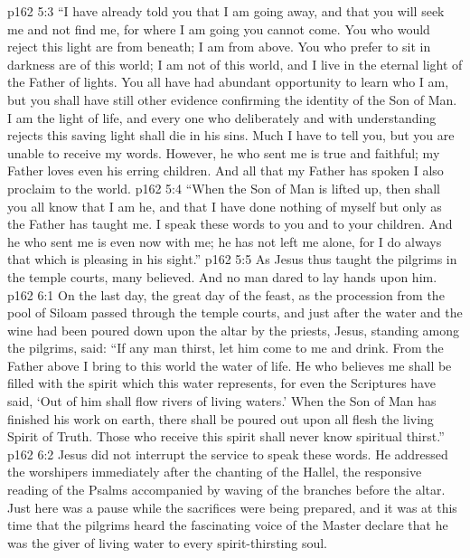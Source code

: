 \vs p162 5:3 \textcolor{ubdarkred}{“I have already told you that I am going away, and that you will seek me and not find me, for where I am going you cannot come. You who would reject this light are from beneath; I am from above. You who prefer to sit in darkness are of this world; I am not of this world, and I live in the eternal light of the Father of lights. You all have had abundant opportunity to learn who I am, but you shall have still other evidence confirming the identity of the Son of Man. I am the light of life, and every one who deliberately and with understanding rejects this saving light shall die in his sins. Much I have to tell you, but you are unable to receive my words. However, he who sent me is true and faithful; my Father loves even his erring children. And all that my Father has spoken I also proclaim to the world.}
\vs p162 5:4 \textcolor{ubdarkred}{“When the Son of Man is lifted up, then shall you all know that I am he, and that I have done nothing of myself but only as the Father has taught me. I speak these words to you and to your children. And he who sent me is even now with me; he has not left me alone, for I do always that which is pleasing in his sight.”}
\vs p162 5:5 \pc As Jesus thus taught the pilgrims in the temple courts, many believed. And no man dared to lay hands upon him.
\vs p162 6:1 On the last day, the great day of the feast, as the procession from the pool of Siloam passed through the temple courts, and just after the water and the wine had been poured down upon the altar by the priests, Jesus, standing among the pilgrims, said: \textcolor{ubdarkred}{“If any man thirst, let him come to me and drink. From the Father above I bring to this world the water of life. He who believes me shall be filled with the spirit which this water represents, for even the Scriptures have said, ‘Out of him shall flow rivers of living waters.’ When the Son of Man has finished his work on earth, there shall be poured out upon all flesh the living Spirit of Truth. Those who receive this spirit shall never know spiritual thirst.”}
\vs p162 6:2 Jesus did not interrupt the service to speak these words. He addressed the worshipers immediately after the chanting of the Hallel, the responsive reading of the Psalms accompanied by waving of the branches before the altar. Just here was a pause while the sacrifices were being prepared, and it was at this time that the pilgrims heard the fascinating voice of the Master declare that he was the giver of living water to every spirit\hyp{}thirsting soul.
